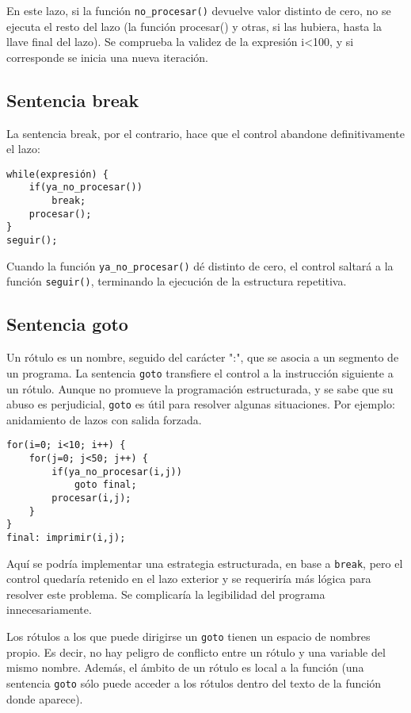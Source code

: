 En este lazo, si la función \lstinline{no_procesar()} devuelve valor distinto de cero, no
se ejecuta el resto del lazo (la función procesar() y otras, si las hubiera,
hasta la llave final del lazo). Se comprueba la validez de la expresión i<100,
y si corresponde se inicia una nueva iteración.

\subsection{Sentencia break}
La sentencia break, por el contrario, hace que el control abandone
definitivamente el lazo:
\begin{lstlisting}
while(expresión) {
    if(ya_no_procesar())
        break;
    procesar();
}
seguir();
\end{lstlisting}

Cuando la función \lstinline{ya_no_procesar()} dé distinto de cero, el control saltará a la
función \lstinline{seguir()}, terminando la ejecución de la estructura repetitiva.

\subsection{Sentencia goto}
Un rótulo es un nombre, seguido del carácter ":", que se asocia a un segmento
de un programa. La sentencia \lstinline{goto} transfiere el control a la instrucción
siguiente a un rótulo. Aunque no promueve la programación estructurada, y se
sabe que su abuso es perjudicial, \lstinline{goto} es útil para resolver algunas
situaciones. Por ejemplo: anidamiento de lazos con salida forzada.
\begin{lstlisting}
for(i=0; i<10; i++) {
    for(j=0; j<50; j++) {
        if(ya_no_procesar(i,j))
            goto final;
        procesar(i,j);
    }
}
final: imprimir(i,j);
\end{lstlisting}

Aquí se podría implementar una estrategia estructurada, en base a \lstinline{break}, pero
el control quedaría retenido en el lazo exterior y se requeriría más lógica
para resolver este problema. Se complicaría la legibilidad del programa
innecesariamente.

Los rótulos a los que puede dirigirse un \lstinline{goto} tienen un espacio de nombres
propio. Es decir, no hay peligro de conflicto entre un rótulo y una variable
del mismo nombre. Además, el ámbito de un rótulo es local a la función (una
sentencia \lstinline{goto} sólo puede acceder a los rótulos dentro del texto de la función
donde aparece).

